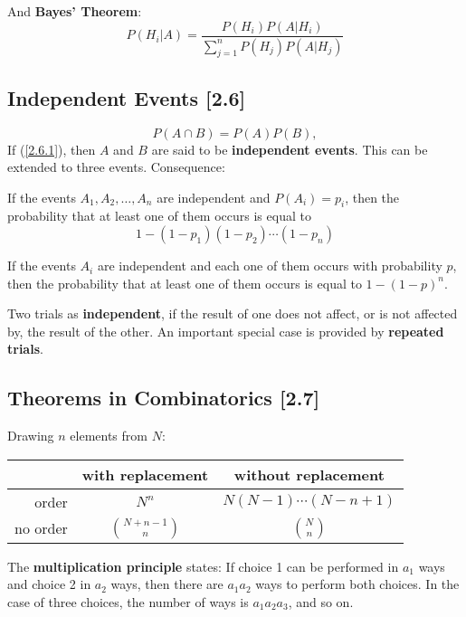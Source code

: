 \documentclass[a4paper,9pt]{extarticle}
\begin{document}
\begin{multicols*}{2}
And \textbf{Bayes' Theorem}:
\begin{equation}
    P(H_i|A) = \frac{P(H_i) P(A|H_i)}{\sum_{j=1}^n P(H_j) P(A|H_j)}
\end{equation}

\subsection{Independent Events [2.6]}
\begin{equation} \label{2.6.1}
    P(A \cap B) = P(A) P(B),
\end{equation}
If (\ref{2.6.1}), then $A$ and $B$ are said to be \textbf{independent events}. This can be extended to three events. Consequence:

If the events $A_1, A_2, \dots, A_n$ are independent and $P(A_i)=p_i$, then the probability that at least one of them occurs is equal to
\begin{equation}
    1 - (1 - p_1)(1 - p_2) \cdots (1 - p_n)
\end{equation}

If the events $A_i$ are independent and each one of them occurs with probability $p$, then the probability that at least one of them occurs is equal to $1 - (1 - p)^n$.

Two trials as \textbf{independent}, if the result of one does not affect, or is not affected by, the result of the other. An important special case is provided by \textbf{repeated trials}.

\subsection{Theorems in Combinatorics [2.7]}
Drawing $n$ elements from $N$:

\renewcommand{\arraystretch}{1.5}
\begin{tabulary}{1.0\textwidth}{r|c|c}
    & with replacement & without replacement \\ \hline
    order & $N^n$ & $N (N-1) \cdots (N-n+1)$ \\ \hline
    no order & $\binom{N+n-1}{n}$ & $\binom{N}{n}$ \\
\end{tabulary}

\rule{0pt}{0.5em}
\renewcommand{\arraystretch}{1}

The \textbf{multiplication principle} states: If choice 1 can be performed in $a_1$ ways and choice 2 in $a_2$ ways, then there are $a_1 a_2$ ways to perform both choices. In the case of three choices, the number of ways is $a_1 a_2 a_3$, and so on.


\end{multicols*}
\end{document}
